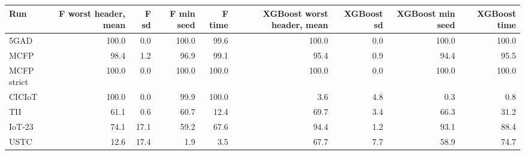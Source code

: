 \begin{tabular}{lrrrrrrrr}
\toprule
Run & F worst header, mean & F sd & F min seed & F time & XGBoost worst header, mean & XGBoost sd & XGBoost min seed & XGBoost time \\
\midrule
5GAD & 100.0 & 0.0 & 100.0 & 99.6 & 100.0 & 0.0 & 100.0 & 100.0 \\
MCFP & 98.4 & 1.2 & 96.9 & 99.1 & 95.4 & 0.9 & 94.4 & 95.5 \\
MCFP strict & 100.0 & 0.0 & 100.0 & 100.0 & 100.0 & 0.0 & 100.0 & 100.0 \\
CICIoT & 100.0 & 0.0 & 99.9 & 100.0 & 3.6 & 4.8 & 0.3 & 0.8 \\
TII & 61.1 & 0.6 & 60.7 & 12.4 & 69.7 & 3.4 & 66.3 & 31.2 \\
IoT-23 & 74.1 & 17.1 & 59.2 & 67.6 & 94.4 & 1.2 & 93.1 & 88.4 \\
USTC & 12.6 & 17.4 & 1.9 & 3.5 & 67.7 & 7.7 & 58.9 & 74.7 \\
\bottomrule
\end{tabular}
